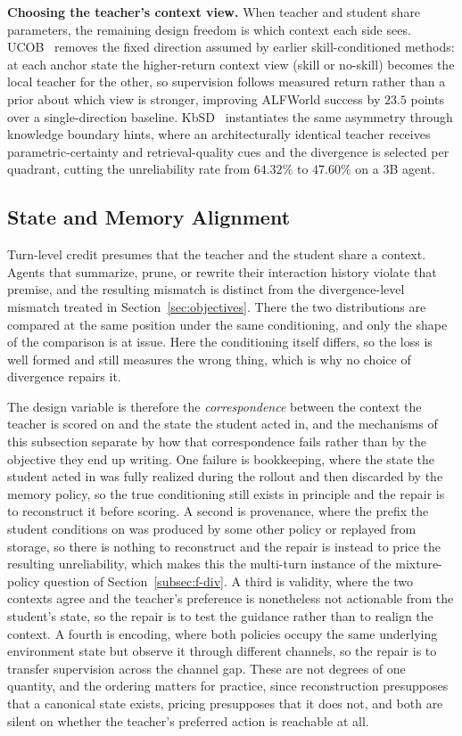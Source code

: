\documentclass{article} %
\begin{document}
\textbf{Choosing the teacher's context view.} When teacher and student share parameters, the remaining design freedom is which context each side sees. UCOB~\citep{2606.29502} removes the fixed direction assumed by earlier skill-conditioned methods: at each anchor state the higher-return context view (skill or no-skill) becomes the local teacher for the other, so supervision follows measured return rather than a prior about which view is stronger, improving ALFWorld success by $23.5$ points over a single-direction baseline. KbSD~\citep{2606.29863} instantiates the same asymmetry through knowledge boundary hints, where an architecturally identical teacher receives parametric-certainty and retrieval-quality cues and the divergence is selected per quadrant, cutting the unreliability rate from $64.32\%$ to $47.60\%$ on a $3$B agent.

\subsection{State and Memory Alignment}
\label{subsec:agentic_state}

Turn-level credit presumes that the teacher and the student share a context. Agents that summarize, prune, or rewrite their interaction history violate that premise, and the resulting mismatch is distinct from the divergence-level mismatch treated in Section~\ref{sec:objectives}. There the two distributions are compared at the same position under the same conditioning, and only the shape of the comparison is at issue. Here the conditioning itself differs, so the loss is well formed and still measures the wrong thing, which is why no choice of divergence repairs it.

The design variable is therefore the \emph{correspondence} between the context the teacher is scored on and the state the student acted in, and the mechanisms of this subsection separate by how that correspondence fails rather than by the objective they end up writing. One failure is bookkeeping, where the state the student acted in was fully realized during the rollout and then discarded by the memory policy, so the true conditioning still exists in principle and the repair is to reconstruct it before scoring. A second is provenance, where the prefix the student conditions on was produced by some other policy or replayed from storage, so there is nothing to reconstruct and the repair is instead to price the resulting unreliability, which makes this the multi-turn instance of the mixture-policy question of Section~\ref{subsec:f-div}. A third is validity, where the two contexts agree and the teacher's preference is nonetheless not actionable from the student's state, so the repair is to test the guidance rather than to realign the context. A fourth is encoding, where both policies occupy the same underlying environment state but observe it through different channels, so the repair is to transfer supervision across the channel gap. These are not degrees of one quantity, and the ordering matters for practice, since reconstruction presupposes that a canonical state exists, pricing presupposes that it does not, and both are silent on whether the teacher's preferred action is reachable at all.
\end{document}
